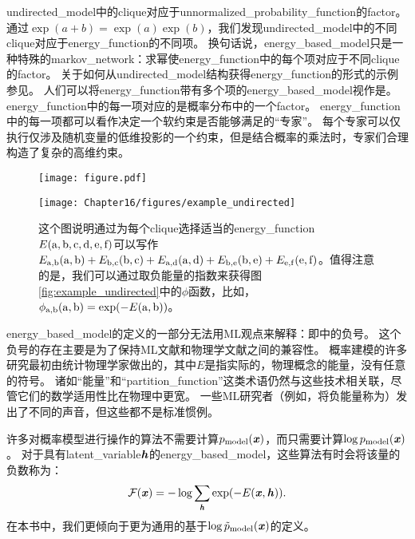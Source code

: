 \gls{undirected_model}中的\gls{clique}对应于\gls{unnormalized_probability_function}的\gls{factor}。 
通过$\exp(a+b) = \exp(a) \exp(b)$，我们发现\gls{undirected_model}中的不同\gls{clique}对应于\gls{energy_function}的不同项。
换句话说，\gls{energy_based_model}只是一种特殊的\gls{markov_network}：求幂使\gls{energy_function}中的每个项对应于不同\gls{clique}的\gls{factor}。
关于如何从\gls{undirected_model}结构获得\gls{energy_function}的形式的示例参见。
人们可以将\gls{energy_function}带有多个项的\gls{energy_based_model}视作是\citep{Hinton99}。
\gls{energy_function}中的每一项对应的是概率分布中的一个\gls{factor}。
\gls{energy_function}中的每一项都可以看作决定一个软约束是否能够满足的``专家''。
每个专家可以仅执行仅涉及随机变量的低维投影的一个约束，但是结合概率的乘法时，专家们合理构造了复杂的高维约束。
\begin{figure}[!htb]
\ifOpenSource
\centerline{\texttt{[image: figure.pdf]}}
\else
	\centerline{\texttt{[image: Chapter16/figures/example\_undirected]}}
\fi
	\caption{这个图说明通过为每个\gls{clique}选择适当的\gls{energy_function}$E(\mathrm{a},\mathrm{b},\mathrm{c},\mathrm{d},\mathrm{e},\mathrm{f})$可以写作$E_{\mathrm{a},\mathrm{b}}(\mathrm{a},\mathrm{b}) + E_{\mathrm{b},\mathrm{c}}(\mathrm{b},\mathrm{c}) + E_{\mathrm{a},\mathrm{d}}(\mathrm{a},\mathrm{d})+  E_{\mathrm{b},\mathrm{e}}(\mathrm{b},\mathrm{e}) + E_{\mathrm{e},\mathrm{f}}(\mathrm{e},\mathrm{f})$。值得注意的是，我们可以通过取负能量的指数来获得图\ref{fig:example_undirected}中的$\phi$函数，比如，$\phi_{\mathrm{a},\mathrm{b}}(\mathrm{a},\mathrm{b}) = \exp(-E(\mathrm{a},\mathrm{b}))$。}
	\label{fig:example_undirected_2}
\end{figure}



\gls{energy_based_model}的定义的一部分无法用\gls{ML}观点来解释：即中的负号。
这个负号的存在主要是为了保持\gls{ML}文献和物理学文献之间的兼容性。
概率建模的许多研究最初由统计物理学家做出的，其中$E$是指实际的，物理概念的能量，没有任意的符号。
诸如``能量''和``\gls{partition_function}''这类术语仍然与这些技术相关联，尽管它们的数学适用性比在物理中更宽。
一些\gls{ML}研究者（例如，\citep{Smolensky86}将负能量称为）发出了不同的声音，但这些都不是标准惯例。


许多对概率模型进行操作的算法不需要计算$p_{\text{model}}(\boldsymbol{\mathit{x}})$，而只需要计算$\log p_{\text{model}}(\boldsymbol{\mathit{x}})$。
对于具有\gls{latent_variable}$\boldsymbol{\mathit{h}}$的\gls{energy_based_model}，这些算法有时会将该量的负数称为：
\begin{align}
\label{eqn:168}
\mathcal{F} (\boldsymbol{\mathit{x}}) = -\log \sum_{\boldsymbol{\mathit{h}}} \exp(-E(\boldsymbol{\mathit{x}},\boldsymbol{\mathit{h}})).
\end{align}
在本书中，我们更倾向于更为通用的基于$\log \tilde{p}_{\text{model}}(\boldsymbol{\mathit{x}})$的定义。


